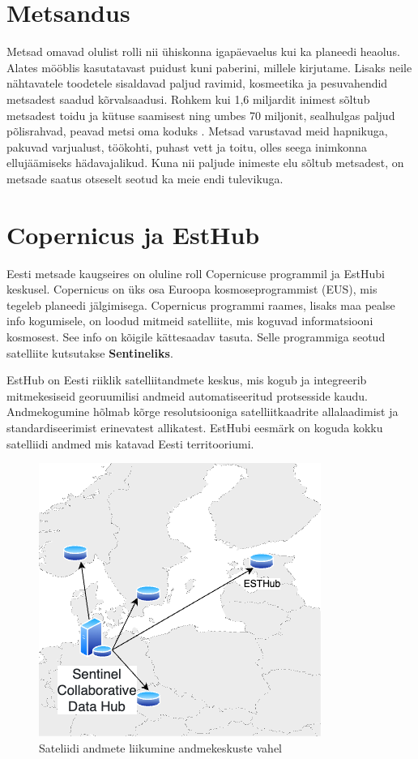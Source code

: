 \section{Metsandus}
Metsad omavad olulist rolli nii ühiskonna igapäevaelus kui ka planeedi heaolus.
Alates mööblis kasutatavast puidust kuni paberini, millele kirjutame. Lisaks neile
nähtavatele toodetele sisaldavad paljud ravimid, kosmeetika ja pesuvahendid
metsadest saadud kõrvalsaadusi. Rohkem kui 1,6 miljardit inimest sõltub
metsadest toidu ja kütuse saamisest ning umbes 70 miljonit, sealhulgas paljud
põlisrahvad, peavad metsi oma koduks \cite{karsentyUnderlyingCausesRapid2003}. 
Metsad varustavad meid hapnikuga, pakuvad
varjualust, töökohti, puhast vett ja toitu, olles seega inimkonna ellujäämiseks
hädavajalikud. Kuna nii paljude inimeste elu sõltub metsadest, on metsade saatus
otseselt seotud ka meie endi tulevikuga. \cite{WWFImportanceForests} 

\section{Copernicus ja EstHub}
Eesti metsade kaugseires on oluline roll Copernicuse programmil ja EstHubi keskusel. Copernicus on üks osa Euroopa kosmoseprogrammist (EUS), mis tegeleb planeedi jälgimisega. Copernicus programmi raames, lisaks maa pealse info kogumisele, on loodud mitmeid satelliite, mis koguvad informatsiooni kosmosest. See info on kõigile kättesaadav tasuta. Selle programmiga seotud satelliite kutsutakse \textbf{Sentineliks}. \cite{CopernicusCopernicus}


EstHub on Eesti riiklik satelliitandmete keskus, mis kogub ja integreerib
mitmekesiseid georuumilisi andmeid automatiseeritud protsesside kaudu.
Andmekogumine hõlmab kõrge resolutsiooniga satelliitkaadrite allalaadimist ja
standardiseerimist erinevatest allikatest. EstHubi eesmärk on koguda kokku satelliidi andmed mis katavad Eesti territooriumi. \cite{maa-ametNationalSatelliteData}

\begin{figure}[H]
    \centering
    \includegraphics[width=.3\textwidth]{figures/datahubEU.drawio.png}
    \caption{Sateliidi andmete liikumine andmekeskuste vahel}
    \label{fig:esthubliiklus}
\end{figure}


